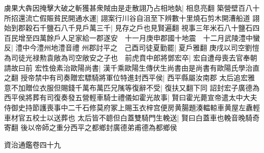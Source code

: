 虜果大犇因掩擊大破之斬獲甚衆賊由是走散詡乃占相地埶|{
	相息亮翻}
築營壁百八十所招還流亡假賑貧民開通水運|{
	詡案行川谷自沮至下辨數十里燒石剪木開漕船道}
詡始到郡穀石千鹽石八千見戶萬三千|{
	見存之戶也見賢遍翻}
視事三年米石八十鹽石四百民增至四萬餘戶人足家給一郡遂安　十一月庚申郡國十地震　十二月武陵澧中蠻反|{
	澧中今澧州地澧音禮}
州郡討平之　己酉司徒夏勤罷|{
	夏戶雅翻}
庚戌以司空劉愷為司徒光禄勲袁敞為司空敞安之子也　前虎賁中郎將鄧宏卒|{
	宏自遭母喪去官奉朝請故曰前}
宏性儉素治歐陽尚書|{
	漢千乘歐陽生傳伏生尚書由是尚書有歐陽氏學治直之翻}
授帝禁中有司奏贈宏驃騎將軍位特進封西平侯|{
	西平縣屬汝南郡}
太后追宏雅意不加贈位衣服但賜錢千萬布萬匹兄隲等復辭不受|{
	復扶又翻下同}
詔封宏子廣德為西平侯將葬有司復奏發五營輕車騎士禮儀如霍光故事|{
	賢曰霍光薨宣帝遣太中大夫侍御史持節護喪事中二千石修莫府冢上賜玉衣梓宫便房黄腸題湊輼輬車黄屋左纛輕車材官五校士以送葬也}
太后皆不聼但白蓋雙騎門生輓送|{
	賢曰白蓋車也輓音晚騎奇寄翻}
後以帝師之重分西平之都鄉封廣德弟甫德為都鄉侯

資治通鑑卷四十九
